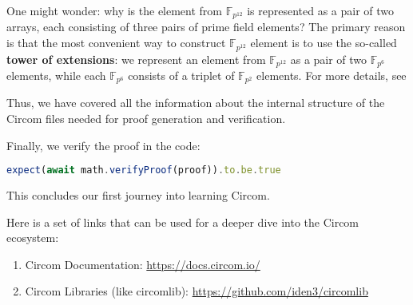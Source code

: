 \documentclass[../lecture-notes.tex]{subfiles}
\begin{document}
    \begin{remark}
        One might wonder: why is the element from $\mathbb{F}_{p^{12}}$ is represented as a pair of two arrays,
        each consisting of three pairs of prime field elements? The primary reason is that the most convenient 
        way to construct $\mathbb{F}_{p^{12}}$ element is to use the so-called \textbf{tower of extensions}: we represent 
        an element from $\mathbb{F}_{p^{12}}$ as a pair of two $\mathbb{F}_{p^6}$ elements, while each $\mathbb{F}_{p^6}$ 
        consists of a triplet of $\mathbb{F}_{p^2}$ elements. For more details, see 
    \end{remark}

    Thus, we have covered all the information about the internal structure of the Circom files needed for proof generation and verification.

    \vspace{0.5cm}

    Finally, we verify the proof in the code:
    \begin{lstlisting}[language=TypeScript,numbers=none,basicstyle=\footnotesize\ttfamily\normalsize]
expect(await math.verifyProof(proof)).to.be.true
    \end{lstlisting}

    This concludes our first journey into learning Circom.

    \begin{remark}
        Here is a set of links that can be used for a deeper dive into the Circom ecosystem:
        \begin{enumerate}
            \item Circom Documentation: \url{https://docs.circom.io/}
            \item Circom Libraries (like circomlib): \url{https://github.com/iden3/circomlib}
        \end{enumerate}
    \end{remark}
\end{document}
